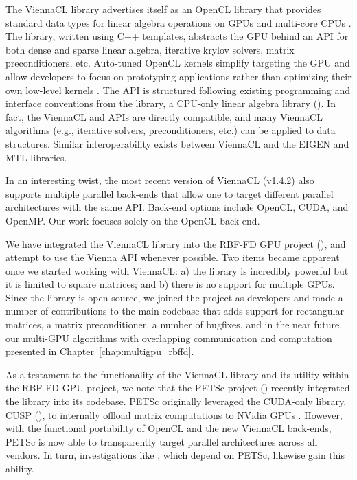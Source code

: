 \documentclass{report}
\begin{document}
The ViennaCL library advertises itself as an OpenCL library that provides standard data types for linear algebra operations on GPUs and multi-core CPUs \cite{Rupp2010}. The library, written using C++ templates, abstracts the GPU behind an API for both dense and sparse linear algebra, iterative krylov solvers, matrix preconditioners, etc. Auto-tuned OpenCL kernels simplify targeting the GPU and allow developers to focus on prototyping applications rather than optimizing their own low-level kernels \cite{Rupp2010a}. 
The API is structured following existing programming and interface conventions from the  library, a CPU-only linear algebra library (\cite{BoostSite}). In fact, the ViennaCL and  APIs are directly compatible, and many ViennaCL algorithms (e.g., iterative solvers, preconditioners, etc.) can be applied to  data structures. Similar interoperability exists between ViennaCL and the EIGEN and MTL libraries. 

In an interesting twist, the most recent version of ViennaCL (v1.4.2) also supports multiple parallel back-ends that allow one to target different parallel architectures with the same API. Back-end options include OpenCL, CUDA, and OpenMP. Our work focuses solely on the OpenCL back-end.

We have integrated the ViennaCL library into the RBF-FD GPU project (\cite{BolligRBFFDCode}), and attempt to use the Vienna API whenever possible. Two items became apparent once we started working with ViennaCL: a) the library is incredibly powerful but it is limited to square matrices; and b) there is no support for multiple GPUs. Since the library is open source, we joined the project as developers and made a number of contributions to the main codebase that adds support for rectangular matrices, a matrix preconditioner, a number of bugfixes, and in the near future,  our multi-GPU algorithms with overlapping communication and computation presented in Chapter~\ref{chap:multigpu_rbffd}.

As a testament to the functionality of the ViennaCL library and its utility within the RBF-FD GPU project, we note that the PETSc project (\cite{petsc-web-page}) recently integrated the library into its codebase. PETSc originally leveraged the CUDA-only library, CUSP (\cite{Cusp2012}), to internally offload matrix computations to NVidia GPUs \cite{Minden2010}. However, with the functional portability of OpenCL and the new ViennaCL back-ends, PETSc is now able to transparently target parallel architectures across all vendors. In turn, investigations like \cite{Yokota2010,Yokota2012}, which depend on PETSc, likewise gain this ability. 
\end{document}
